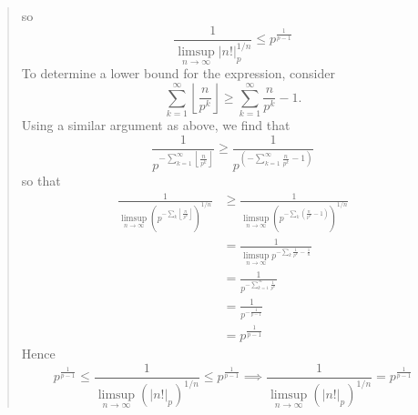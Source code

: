 \documentclass{hw}
\begin{document}
\begin{enumerate}
\begin{quote}
\[			  \]
			  so
			  \[
			  	\frac{1}{\limsup_{n\to\infty}|n!|_{p}^{1/n}} \leq p^{\frac{1}{p-1}}
			  \]
			  To determine a lower bound for the expression, consider
			  \[
			  	\sum_{k=1}^{\infty}\left\lfloor\frac{n}{p^{k}}\right\rfloor \geq \sum_{k=1}^{\infty}\frac{n}{p^{k}}-1.
			  \]
			  Using a similar argument as above, we find that
			  \[
			  	\frac{1}{p^{-\sum_{k=1}^{\infty}\left\lfloor\frac{n}{p^{k}}\right\rfloor}} \geq
				\frac{1}{p^{\left(-\sum_{k=1}^{\infty}\frac{n}{p^{k}}-1\right)}}
			  \]
			  so that
			  \begin{align*}
				\frac{1}{\limsup_{n\to\infty}\left(p^{-\sum_{k}\left\lfloor\frac{n}{p^k}\right\rfloor}\right)^{1/n}} &\geq
				\frac{1}{\limsup_{n\to\infty}\left(p^{-\sum_{k}\left(\frac{n}{p^k}-1\right)}\right)^{1/n}}\\
				&=\frac{1}{\limsup_{n\to\infty}p^{-\sum_{k}\frac{1}{p^k}-\frac{1}{n}}}\\
				&= \frac{1}{p^{-\sum_{k=1}^{\infty}\frac{1}{p^{k}}}}\\
				&= \frac{1}{p^{-\frac{1}{p-1}}}\\
				&= p^{\frac{1}{p-1}}
			  \end{align*}
			  Hence
			  \[
			  	p^{\frac{1}{p-1}}\leq
				\frac{1}{\limsup_{n\to\infty}(|n!|_{p})^{1/n}}
				\leq p^{\frac{1}{p-1}}\implies
				\frac{1}{\limsup_{n\to\infty}(|n!|_{p})^{1/n}} = p^{\frac{1}{p-1}}
			  \]
		  \end{quote}
\end{enumerate}
\end{document}
